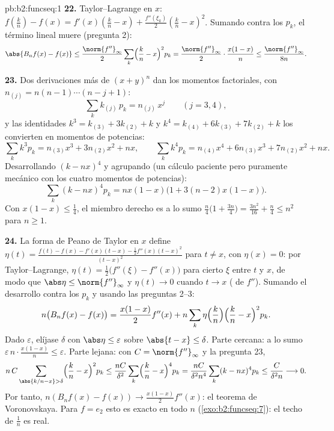 \begin{solution}{pb:b2:funcseq:1}
\textbf{22.} Taylor--Lagrange en $x$: $f(\frac kn) - f(x) =
f'(x)(\frac kn - x) + \frac{f''(\xi_k)}2(\frac kn - x)^2$. Sumando
contra los $p_k$, el término lineal muere (pregunta 2):
\[
\abs{B_nf(x) - f(x)}
\leq \frac{\norm{f''}_\infty}{2}\sum_k\Bigl(\frac kn -
x\Bigr)^2p_k
= \frac{\norm{f''}_\infty}{2}\cdot\frac{x(1-x)}{n}
\leq \frac{\norm{f''}_\infty}{8n} .
\]

\textbf{23.} Dos derivaciones más de $(x+y)^n$ dan los momentos
factoriales, con $n_{(j)} = n(n-1)\cdots(n-j+1)$:
\[
\sum_k k_{(j)}\,p_k = n_{(j)}\,x^j \qquad (j = 3, 4),
\]
y las identidades $k^3 = k_{(3)} + 3k_{(2)} + k$ y $k^4 = k_{(4)} +
6k_{(3)} + 7k_{(2)} + k$ los convierten en momentos de potencias:
\[
\sum_k k^3p_k = n_{(3)}x^3 + 3n_{(2)}x^2 + nx,
\qquad
\sum_k k^4p_k = n_{(4)}x^4 + 6n_{(3)}x^3 + 7n_{(2)}x^2 + nx .
\]
Desarrollando $(k - nx)^4$ y agrupando (un cálculo paciente pero
puramente mecánico con los cuatro momentos de potencias):
\[
\sum_k(k-nx)^4p_k = nx(1-x)\bigl(1 + 3(n-2)x(1-x)\bigr) .
\]
Con $x(1-x) \leq \frac14$, el miembro derecho es a lo sumo $\frac
n4\bigl(1 + \frac{3n}4\bigr) = \frac{3n^2}{16} + \frac n4 \leq n^2$
para $n \geq 1$.

\textbf{24.} La forma de Peano de Taylor en $x$ define $\eta(t) =
\frac{f(t) - f(x) - f'(x)(t-x) - \frac12f''(x)(t-x)^2} {(t-x)^2}$
para $t \neq x$, con $\eta(x) = 0$: por Taylor--Lagrange, $\eta(t) =
\frac12\bigl(f''(\xi) - f''(x)\bigr)$ para cierto $\xi$ entre $t$ y
$x$, de modo que $\abs\eta \leq \norm{f''}_\infty$ y $\eta(t) \to 0$
cuando $t \to x$ ( de $f''$). Sumando el desarrollo
contra los $p_k$ y usando las preguntas 2--3:
\[
n\bigl(B_nf(x) - f(x)\bigr)
= \frac{x(1-x)}{2}f''(x)
+ n\sum_k\eta\Bigl(\frac kn\Bigr)\Bigl(\frac kn -
x\Bigr)^2p_k .
\]
Dado $\varepsilon$, elíjase $\delta$ con $\abs\eta \leq \varepsilon$
sobre $\abs{t - x}\leq\delta$. Parte cercana: a lo sumo
$\varepsilon\,n\cdot\frac{x(1-x)}n \leq \varepsilon$. Parte lejana:
con $C = \norm{f''}_\infty$ y la pregunta 23,
\[
n\,C\sum_{\abs{k/n-x}>\delta}\Bigl(\frac kn -
x\Bigr)^2p_k
\leq \frac{nC}{\delta^2}\sum_k\Bigl(\frac kn -
x\Bigr)^4p_k
= \frac{nC}{\delta^2 n^4}\sum_k(k-nx)^4p_k
\leq \frac{C}{\delta^2 n} \longrightarrow 0 .
\]
Por tanto, $n(B_nf(x) - f(x)) \to \frac{x(1-x)}2f''(x)$: el teorema
de Voronovskaya. Para $f = e_2$ esto es exacto en todo $n$
(\cref{exo:b2:funcseq:7}): el techo de $\frac1n$ es real.


\end{solution}
